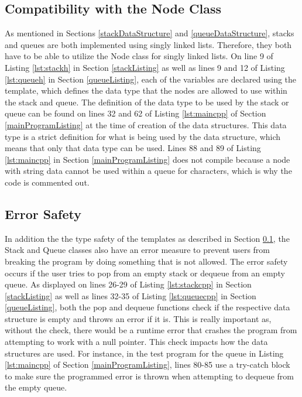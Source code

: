 \documentclass[letterpaper, 10pt,DIV=13]{scrartcl}
\numberwithin{equation}{section} %
\numberwithin{figure}{section} %
\numberwithin{table}{section} %
\begin{document}
\subsection{Compatibility with the Node Class}\label{nodeCompatibility}
As mentioned in Sections \ref{stackDataStructure} and \ref{queueDataStructure}, stacks and queues are both implemented using singly linked lists. Therefore, they both have to be able to utilize the Node class for singly linked lists. On line 9 of Listing \ref{lst:stackh} in Section \ref{stackListing} as well as lines 9 and 12 of Listing \ref{lst:queueh} in Section \ref{queueListing}, each of the variables are declared using the template, which defines the data type that the nodes are allowed to use within the stack and queue. The definition of the data type to be used by the stack or queue can be found on lines 32 and 62 of Listing \ref{lst:maincpp} of Section \ref{mainProgramListing} at the time of creation of the data structures. This data type is a strict definition for what is being used by the data structure, which means that only that data type can be used. Lines 88 and 89 of Listing \ref{lst:maincpp} in Section \ref{mainProgramListing} does not compile because a node with string data cannot be used within a queue for characters, which is why the code is commented out.

\subsection{Error Safety}
In addition the the type safety of the templates as described in Section \ref{nodeCompatibility}, the Stack and Queue classes also have an error measure to prevent users from breaking the program by doing something that is not allowed. The error safety occurs if the user tries to pop from an empty stack or dequeue from an empty queue. As displayed on lines 26-29 of Listing \ref{lst:stackcpp} in Section \ref{stackListing} as well as lines 32-35 of Listing \ref{lst:queuecpp} in Section \ref{queueListing}, both the pop and dequeue functions check if the respective data structure is empty and throws an error if it is. This is really important as, without the check, there would be a runtime error that crashes the program from attempting to work with a null pointer. This check impacts how the data structures are used. For instance, in the test program for the queue in Listing \ref{lst:maincpp} of Section \ref{mainProgramListing}, lines 80-85 use a try-catch block to make sure the programmed error is thrown when attempting to dequeue from the empty queue.
\end{document}

